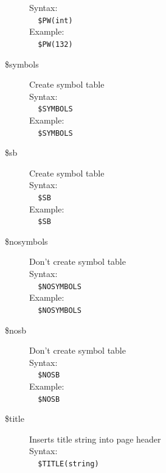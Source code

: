 \documentclass[a4paper,twoside,12pt]{book}
\begin{document}
\begin{description}
				Syntax:\\
				\verb'  '{\color{highlight_control}\verb'$PW'}{\color{highlight_symbol}\verb'('}{\color{highlight_string}\verb'int'}{\color{highlight_symbol}\verb')'}\\
				Example:\\
				\verb'  '{\color{highlight_control}\verb'$PW'}{\color{highlight_symbol}\verb'('}{\color{highlight_string}\verb'132'}{\color{highlight_symbol}\verb')'}\\
			\item[\$symbols] Create symbol table\\
				Syntax:\\
				\verb'  '{\color{highlight_control}\verb'$SYMBOLS'}\\
				Example:\\
				\verb'  '{\color{highlight_control}\verb'$SYMBOLS'}\\
			\item[\$sb] Create symbol table\\
				Syntax:\\
				\verb'  '{\color{highlight_control}\verb'$SB'}\\
				Example:\\
				\verb'  '{\color{highlight_control}\verb'$SB'}\\
			\item[\$nosymbols] Don't create symbol table\\
				Syntax:\\
				\verb'  '{\color{highlight_control}\verb'$NOSYMBOLS'}\\
				Example:\\
				\verb'  '{\color{highlight_control}\verb'$NOSYMBOLS'}\\
			\item[\$nosb] Don't create symbol table\\
				Syntax:\\
				\verb'  '{\color{highlight_control}\verb'$NOSB'}\\
				Example:\\
				\verb'  '{\color{highlight_control}\verb'$NOSB'}\\
			\item[\$title] Inserts title string into page header\\
				Syntax:\\
				\verb'  '{\color{highlight_control}\verb'$TITLE'}{\color{highlight_symbol}\verb'('}{\color{highlight_string}\verb'string'}{\color{highlight_symbol}\verb')'}\\

\end{description}
\end{document}

